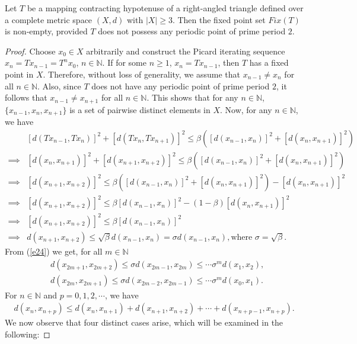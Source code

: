 \documentclass[10pt,a4paper]{amsart}
\begin{document}
\begin{theorem}\label{25}
Let $T$ be a mapping contracting hypotenuse of a right-angled triangle defined over a complete metric space $(X,d)$ with $|X|\ge 3$. Then the fixed point set $Fix(T)$ is non-empty, provided $T$ does not possess any periodic point of prime period $2$.
\end{theorem}

\begin{proof}
Choose $x_0\in X$ arbitrarily and construct the Picard iterating sequence $x_n=Tx_{n-1}=T^n x_0$, $n\in \mathbb{N}$. If for some $n\ge 1$, $x_n=Tx_{n-1}$, then $T$ has a fixed point in $X$. Therefore, without loss of generality, we assume that $x_{n-1} \neq x_n$ for all $n \in \mathbb{N}$. Also, since $T$ does not have any periodic point of prime period $2$, it follows that $x_{n-1} \neq x_{n+1}$ for all $n \in \mathbb{N}$. This shows that for any $n \in \mathbb{N}$, $\{x_{n-1}, x_n, x_{n+1}\}$ is a set of pairwise distinct elements in $X$. Now, for any $n \in \mathbb{N}$, we have
\begin{align}\label{e24}
&[d(Tx_{n-1},Tx_{n})]^2 + [d(Tx_{n},Tx_{n+1})]^2 
\le \beta ([d(x_{n-1},x_{n})]^2+[d(x_{n},x_{n+1})]^2)\nonumber\\
\implies &[d(x_{n},x_{n+1})]^2+[d(x_{n+1},x_{n+2})]^2 
\le \beta ([d(x_{n-1},x_{n})]^2+[d(x_{n},x_{n+1})]^2)\nonumber\\
\implies &[d(x_{n+1},x_{n+2})]^2 
\le \beta ([d(x_{n-1},x_{n})]^2+[d(x_{n},x_{n+1})]^2)-[d(x_{n},x_{n+1})]^2\nonumber\\
\implies &[d(x_{n+1},x_{n+2})]^2 
\le \beta [d(x_{n-1},x_{n})]^2-(1-\beta)[d(x_{n},x_{n+1})]^2\nonumber\\
\implies &[d(x_{n+1},x_{n+2})]^2 \le \beta [d(x_{n-1},x_{n})]^2\nonumber\\
\implies &d(x_{n+1},x_{n+2}) \le \sqrt{\beta} d(x_{n-1},x_{n})=\sigma d(x_{n-1},x_{n}),\text{where }\sigma=\sqrt{\beta}.
\end{align}
From (\ref{e24}) we get, for all $m \in \mathbb{N}$ 
\begin{align*}
&d(x_{2m+1},x_{2m+2}) \le \sigma d(x_{2m-1},x_{2m}) \le \cdots \sigma^m d(x_1,x_2),\\
&d(x_{2m},x_{2m+1}) \le \sigma d(x_{2m-2},x_{2m-1}) \le \cdots \sigma^m d(x_0,x_1).
\end{align*}
For $n \in \mathbb{N}$ and $p=0,1,2,\cdots$, we have 
\begin{align}\label{e25}
d(x_n,x_{n+p})\le d(x_n,x_{n+1})+d(x_{n+1},x_{n+2})+\cdots+d(x_{n+p-1},x_{n+p}).
\end{align}
We now observe that four distinct cases arise, which will be examined in the following:


\end{proof}
\end{document}
